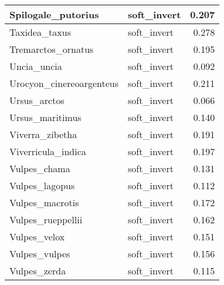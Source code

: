 \begin{table}
\begin{tabular}[t]{l|l|r}
\hline
Spilogale\_putorius & soft\_invert & 0.207\\
\hline
Taxidea\_taxus & soft\_invert & 0.278\\
\hline
Tremarctos\_ornatus & soft\_invert & 0.195\\
\hline
Uncia\_uncia & soft\_invert & 0.092\\
\hline
Urocyon\_cinereoargenteus & soft\_invert & 0.211\\
\hline
Ursus\_arctos & soft\_invert & 0.066\\
\hline
Ursus\_maritimus & soft\_invert & 0.140\\
\hline
Viverra\_zibetha & soft\_invert & 0.191\\
\hline
Viverricula\_indica & soft\_invert & 0.197\\
\hline
Vulpes\_chama & soft\_invert & 0.131\\
\hline
Vulpes\_lagopus & soft\_invert & 0.112\\
\hline
Vulpes\_macrotis & soft\_invert & 0.172\\
\hline
Vulpes\_rueppellii & soft\_invert & 0.162\\
\hline
Vulpes\_velox & soft\_invert & 0.151\\
\hline
Vulpes\_vulpes & soft\_invert & 0.156\\
\hline
Vulpes\_zerda & soft\_invert & 0.115\\
\hline
\end{tabular}
\end{table}

